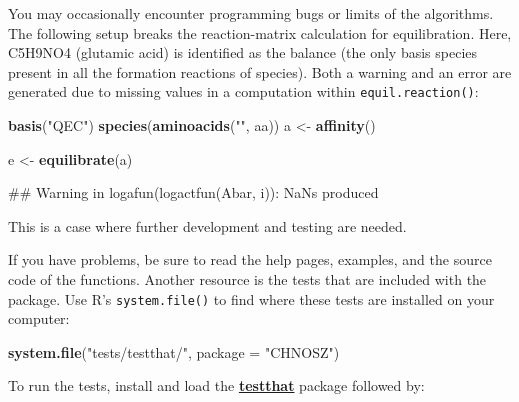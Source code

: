 \documentclass[]{tufte-handout}
\newenvironment{Shaded}{}{}
\newcommand{\KeywordTok}[1]{\textcolor[rgb]{0.00,0.44,0.13}{\textbf{#1}}}
\newcommand{\DataTypeTok}[1]{\textcolor[rgb]{0.56,0.13,0.00}{#1}}
\newcommand{\StringTok}[1]{\textcolor[rgb]{0.25,0.44,0.63}{#1}}
\newcommand{\NormalTok}[1]{#1}
\begin{document}
You may occasionally encounter programming bugs or limits of the
algorithms. The following setup breaks the reaction-matrix calculation
for equilibration. Here, C5H9NO4 (glutamic acid) is identified as the
balance (the only basis species present in all the formation reactions
of species). Both a warning and an error are generated due to missing
values in a computation within {\texttt{equil.reaction()}}:

\begin{Shaded}
\begin{Highlighting}[]
\KeywordTok{basis}\NormalTok{(}\StringTok{"QEC"}\NormalTok{)}
\KeywordTok{species}\NormalTok{(}\KeywordTok{aminoacids}\NormalTok{(}\StringTok{""}\NormalTok{, aa))}
\NormalTok{a <-}\StringTok{ }\KeywordTok{affinity}\NormalTok{()}
\end{Highlighting}
\end{Shaded}

\begin{Shaded}
\begin{Highlighting}[]
\NormalTok{e <-}\StringTok{ }\KeywordTok{equilibrate}\NormalTok{(a)}
\end{Highlighting}
\end{Shaded}

\begin{Shaded}
\begin{Highlighting}[]
\NormalTok{## Warning in logafun(logactfun(Abar, i)): NaNs produced}
\end{Highlighting}
\end{Shaded}

This is a case where further development and testing are needed.

If you have problems, be sure to read the help pages, examples, and the
source code of the functions. Another resource is the tests that are
included with the package. Use R's \texttt{system.file()} to find where
these tests are installed on your computer:

\begin{Shaded}
\begin{Highlighting}[]
\KeywordTok{system.file}\NormalTok{(}\StringTok{"tests/testthat/"}\NormalTok{, }\DataTypeTok{package =} \StringTok{"CHNOSZ"}\NormalTok{)}
\end{Highlighting}
\end{Shaded}

To run the tests, install and load the
\href{https://cran.r-project.org/package=testthat}{\textbf{testthat}}
package followed by:
\end{document}

